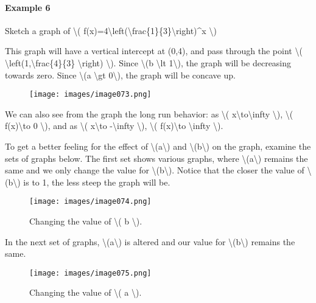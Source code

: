 \hypertarget{example-6}{%
\paragraph{Example 6}\label{example-6}}

Sketch a graph of \textbackslash{}(
f(x)=4\textbackslash{}left(\textbackslash{}frac\{1\}\{3\}\textbackslash{}right)\^{}x
\textbackslash{})

This graph will have a vertical intercept at (0,4), and pass through the
point \textbackslash{}(
\textbackslash{}left(1,\textbackslash{}frac\{4\}\{3\}
\textbackslash{}right) \textbackslash{}). Since \textbackslash{}(b
\textbackslash{}lt 1\textbackslash{}), the graph will be decreasing
towards zero. Since \textbackslash{}(a \textbackslash{}gt
0\textbackslash{}), the graph will be concave up.

\begin{figure}
\centering
\texttt{[image: images/image073.png]}
\caption{}
\end{figure}

We can also see from the graph the long run behavior: as
\textbackslash{}( x\textbackslash{}to\textbackslash{}infty
\textbackslash{}), \textbackslash{}( f(x)\textbackslash{}to 0
\textbackslash{}), and as \textbackslash{}( x\textbackslash{}to
-\textbackslash{}infty \textbackslash{}), \textbackslash{}(
f(x)\textbackslash{}to \textbackslash{}infty \textbackslash{}).

To get a better feeling for the effect of
\textbackslash{}(a\textbackslash{}) and
\textbackslash{}(b\textbackslash{}) on the graph, examine the sets of
graphs below. The first set shows various graphs, where
\textbackslash{}(a\textbackslash{}) remains the same and we only change
the value for \textbackslash{}(b\textbackslash{}). Notice that the
closer the value of \textbackslash{}(b\textbackslash{}) is to 1, the
less steep the graph will be.

\begin{figure}
\centering
\texttt{[image: images/image074.png]}
\caption{Changing the value of \textbackslash{}( b \textbackslash{}).}
\end{figure}

In the next set of graphs, \textbackslash{}(a\textbackslash{}) is
altered and our value for \textbackslash{}(b\textbackslash{}) remains
the same.

\begin{figure}
\centering
\texttt{[image: images/image075.png]}
\caption{Changing the value of \textbackslash{}( a \textbackslash{}).}
\end{figure}

